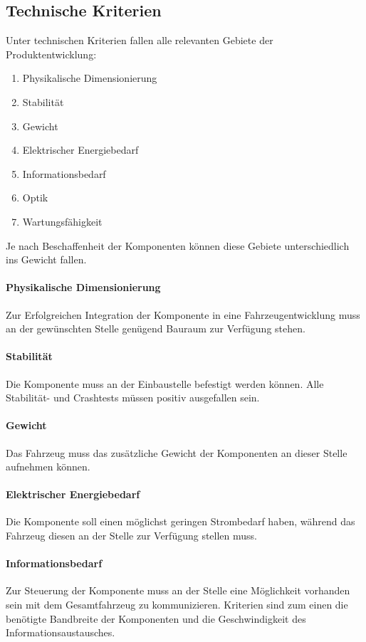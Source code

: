 \subsection{Technische Kriterien}
Unter technischen Kriterien fallen alle relevanten Gebiete der Produktentwicklung:
\begin{enumerate}
	\item Physikalische Dimensionierung
	\item Stabilität
	\item Gewicht
	\item Elektrischer Energiebedarf
	\item Informationsbedarf
	\item Optik
	\item Wartungsfähigkeit
\end{enumerate}
Je nach Beschaffenheit der Komponenten können diese Gebiete unterschiedlich ins Gewicht fallen.
\paragraph{Physikalische Dimensionierung}
Zur Erfolgreichen Integration der Komponente in eine Fahrzeugentwicklung muss an der gewünschten Stelle genügend Bauraum zur Verfügung stehen.
\paragraph{Stabilität}
Die Komponente muss an der Einbaustelle befestigt werden können. Alle Stabilität- und Crashtests müssen positiv ausgefallen sein.
\paragraph{Gewicht}
Das Fahrzeug muss das zusätzliche Gewicht der Komponenten an dieser Stelle aufnehmen können.
\paragraph{Elektrischer Energiebedarf}
Die Komponente soll einen möglichst geringen Strombedarf haben, während das Fahrzeug diesen an der Stelle zur Verfügung stellen muss.
\paragraph{Informationsbedarf}
Zur Steuerung der Komponente muss an der Stelle eine Möglichkeit vorhanden sein mit dem Gesamtfahrzeug zu kommunizieren. Kriterien sind zum einen die benötigte Bandbreite der Komponenten und die Geschwindigkeit des Informationsaustausches.
